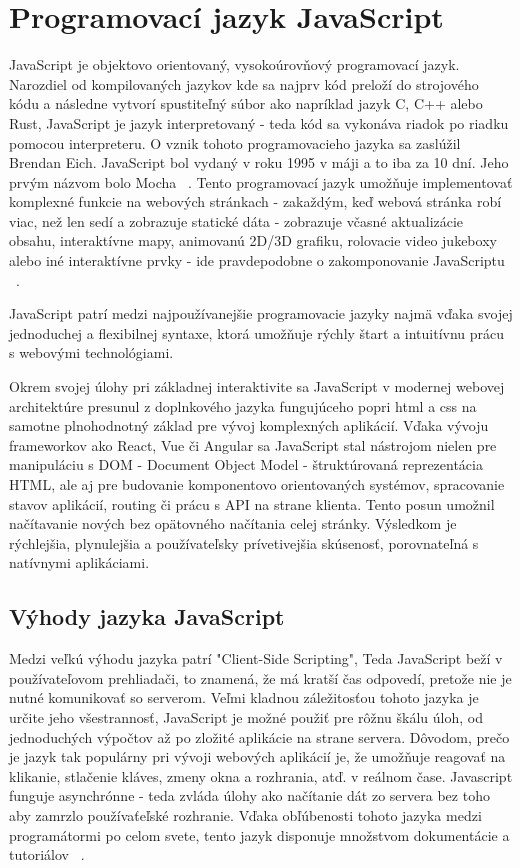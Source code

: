 \section {Programovací jazyk JavaScript}
JavaScript je objektovo orientovaný, vysokoúrovňový programovací jazyk. Narozdiel od kompilovaných jazykov kde
sa najprv kód preloží do strojového kódu a následne vytvorí spustiteľný súbor ako napríklad jazyk C, C++ alebo Rust, JavaScript 
je jazyk interpretovaný - teda kód sa vykonáva riadok po riadku pomocou interpreteru.
O vznik tohoto programovacieho jazyka sa zaslúžil Brendan Eich. JavaScript bol vydaný v roku 1995 v máji a to iba za 
10 dní. Jeho prvým názvom bolo Mocha ~\cite{geeksforgeeks_js}. 
Tento programovací jazyk umožňuje implementovať komplexné funkcie na webových stránkach - zakaždým, keď webová
stránka robí viac, než len sedí a zobrazuje statické dáta - zobrazuje včasné aktualizácie obsahu, interaktívne mapy,
animovanú 2D/3D grafiku, rolovacie video jukeboxy alebo iné interaktívne prvky - ide pravdepodobne o zakomponovanie JavaScriptu ~\cite{mdn_js}. 

JavaScript patrí medzi najpoužívanejšie programovacie jazyky najmä vďaka svojej jednoduchej a flexibilnej syntaxe, ktorá umožňuje rýchly štart 
a intuitívnu prácu s webovými technológiami.

Okrem svojej úlohy pri základnej interaktivite sa JavaScript v modernej webovej architektúre presunul z doplnkového jazyka fungujúceho popri 
html a css na samotne plnohodnotný základ pre vývoj komplexných aplikácií. Vďaka vývoju frameworkov ako React, Vue či Angular sa JavaScript 
stal nástrojom nielen pre manipuláciu s DOM - Document Object Model - štruktúrovaná reprezentácia HTML, ale aj pre budovanie komponentovo 
orientovaných systémov, spracovanie stavov aplikácií, routing či prácu s API na strane klienta. Tento posun umožnil načítavanie nových bez 
opätovného načítania celej stránky. Výsledkom je rýchlejšia, plynulejšia a používateľsky prívetivejšia skúsenosť, porovnateľná s natívnymi 
aplikáciami.

\subsection{Výhody jazyka JavaScript}
Medzi veľkú výhodu jazyka patrí "Client-Side Scripting", Teda JavaScript beží v používateľovom prehliadači, to znamená, že má kratší čas 
odpovedí, pretože nie je nutné komunikovať so serverom. Veľmi kladnou záležitosťou tohoto jazyka je určite jeho všestrannosť,
JavaScript je možné použiť pre rôžnu škálu úloh, od jednoduchých výpočtov až po zložité aplikácie na strane servera. Dôvodom, prečo je jazyk tak 
populárny pri vývoji webových aplikácií je, že umožňuje reagovať na klikanie, stlačenie kláves, zmeny okna a rozhrania, atď. v reálnom čase.
Javascript funguje asynchrónne - teda zvláda úlohy ako načítanie dát zo servera bez toho aby zamrzlo používaťeľské rozhranie. Vďaka 
obľúbenosti tohoto jazyka medzi  programátormi po celom svete, tento jazyk disponuje množstvom dokumentácie a tutoriálov ~\cite{gfg_intro_js}.

